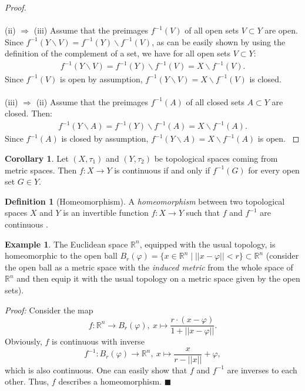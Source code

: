 \documentclass[12pt, a4paper]{article}
\numberwithin{equation}{section}
\theoremstyle{definition}
\theoremstyle{definition}
\newtheorem{defn}[thm]{Definition} %
\newtheorem{exmp}[thm]{Example} %
\newtheorem{corollary}[thm]{Corollary}
\begin{document}
\begin{proof}
		\\ 
		\\
		(ii) $\Rightarrow$ (iii) Assume that the preimages $f^{-1}(V)$ of all open sets $V\subset Y$ are open. Since $f^{-1}(Y\backslash V) = f^{-1}(Y)\backslash f^{-1}(V)$, as can be easily shown by using the definition of the complement of a set, we have for all open sets $V \subset Y$: 
		\begin{align}
			f^{-1}(Y\backslash V) = f^{-1}(Y)\backslash f^{-1}(V) = X\backslash f^{-1}(V). 
		\end{align}
		Since $f^{-1}(V)$ is open by assumption, $f^{-1}(Y\backslash V) = X\backslash f^{-1}(V)$ is closed. 
		\\ 
		\\
		(iii) $\Rightarrow$ (ii) Assume that the preimages $f^{-1}(A)$
		of all closed sets $A\subset Y$ are closed. Then: 
		\begin{align}
			f^{-1}(Y\backslash A) = f^{-1}(Y)\backslash f^{-1}(A) = X\backslash f^{-1}(A). 
		\end{align}
		Since $f^{-1}(A)$ is closed by assumption, $f^{-1}(Y\backslash A) = X\backslash f^{-1}(A)$ is open. \cite{preimage-of-closed-sets}
	\end{proof} 
	
	\begin{corollary}
		Let $(X, \tau_1)$ and $(Y, \tau_2)$ be topological spaces coming from metric spaces. Then $f: X\rightarrow Y$ is continuous if and only if $f^{-1}(G)$ for every open set $G\in Y$. 
	\end{corollary}
	
	\begin{defn}[Homeomorphism] A \textit{homeomorphism} between two topological spaces $X$ and $Y$ is an invertible function $f: X\rightarrow Y$ such that $f$ and $f^{-1}$ are continuous \cite[p. 33]{topology-singh}. 
	\end{defn}

	\begin{exmp}
		The Euclidean space $\mathbb R^n$, equipped with the usual topology, is homeomorphic to the open ball $B_{r}(\varphi) =  \{x\in\mathbb R^n \mid \lvert\lvert x-\varphi \rvert\rvert < r \} \subset \mathbb R^n$ (consider the open ball as a metric space with the \textit{induced metric} from the whole space of $\mathbb R^n$ and then equip it with the usual topology on a metric space given by the open sets). 
	\end{exmp}
	\noindent\textit{Proof:} Consider the map $$f: \mathbb R^n\rightarrow B_r(\varphi), \ x\mapsto \frac{r\cdot (x-\varphi)}{1+\lvert\lvert x-\varphi\rvert\rvert}.$$ Obviously, $f$ is continuous with inverse $$f^{-1}: B_r(\varphi)\rightarrow \mathbb R^n, \ x \mapsto \frac{x}{r-\lvert\lvert x\rvert\rvert}+\varphi,$$ which is also continuous. One can easily show that $f$ and $f^{-1}$ are inverses to each other. Thus, $f$ describes a homeomorphism. 	\qquad\qquad\qquad\qquad\qquad\qquad\qquad\qquad\qquad\qquad\qquad\qquad\qquad\qquad\qquad$\blacksquare$
	
\end{document}
